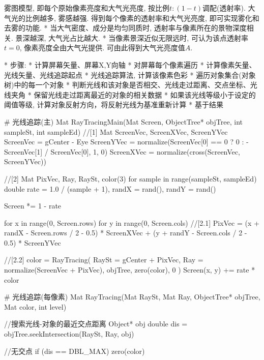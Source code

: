 							\Notes
								雾图模型, 即每个原始像素亮度和大气光亮度, 按比例$t : (1-t)$调配(透射率). 大气光的比例越多, 雾感越强. 得到每个像素的透射率和大气光亮度, 即可实现雾化和去雾的功能.
								* 当大气密度、成分是均匀同质时, 透射率与像素所在的景物深度相关. 景深越深, 大气光占比越大. 
								* 当像素景深近似无限远时, 可认为该点透射率$t = 0$, 像素亮度全由大气光提供. 可由此得到大气光亮度值$A$.

						* 步骤:
							* 计算屏幕矢量、屏幕X,Y向轴
							* 对屏幕每个像素遍历
								* 计算像素矢量、光线矢量、光线追踪起点
								* 光线追踪算法, 计算该像素色彩
									* 遍历对象集合(对象树)中的每一个对象
										* 判断光线和该对象是否相交、光线走过距离、交点坐标、光线夹角
										* 保留光线走过距离最近的对象的相关数据
									* 如果该光线等级小于设定的阈值等级, 计算对象反射方向，将反射光线为基准重新计算
								* 基于结果

						\Codes
							# 光线追踪(主)
							Mat RayTracingMain(Mat Screen, ObjectTree* objTree, int sampleSt, int sampleEd)
								//[1]
								Mat ScreenVec, ScreenXVec, ScreenYVec
								ScreenVec = gCenter - Eye
								ScreenYVec = normalize({ScreenVec[0] == 0 ? 0 : -ScreenVec[1] / ScreenVec[0], 1, 0})
								ScreenXVec = normalize(cross(ScreenVec, ScreenYVec))

								//[2]
								Mat PixVec, Ray, RaySt, color(3)
								for sample in range(sampleSt, sampleEd)
									double rate = 1.0 / (sample + 1), randX = rand(), randY = rand()

									Screen *= 1 - rate

									for x in range(0, Screen.rows)
										for y in range(0, Screen.cols)
											//[2.1]
											PixVec 
												= (x + randX - Screen.rows / 2 - 0.5) * ScreenXVec 
												+ (y + randY - Screen.cols / 2 - 0.5) * ScreenYVec

											//[2.2]
											color = RayTracing(
												RaySt = gCenter + PixVec, 
												Ray = normalize(ScreenVec + PixVec), 
												objTree, zero(color), 0
											) 
											Screen(x, y) += rate * color

							# 光线追踪(每像素)
							Mat RayTracing(Mat RaySt, Mat Ray, ObjectTree* objTree, Mat color, int level) 

								//搜索光线-对象的最近交点距离
								Object* obj
								double dis = objTree.seekIntersection(RaySt, Ray, obj) 

								//无交点
								if (dis == DBL_MAX) 
									zero(color)
							

